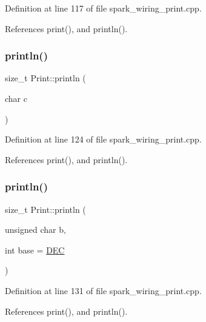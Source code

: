 Definition at line 117 of file spark\+\_\+wiring\+\_\+print.\+cpp.



References print(), and println().

\mbox{\label{class_print_a554896a71162f967b5794401239d7a01}} 
\subsubsection{\texorpdfstring{println()}{println()}\hspace{0.1cm}{\footnotesize\ttfamily [2/21]}}
{\footnotesize\ttfamily size\+\_\+t Print\+::println (\begin{DoxyParamCaption}\item[{char}]{c }\end{DoxyParamCaption})}



Definition at line 124 of file spark\+\_\+wiring\+\_\+print.\+cpp.



References print(), and println().

\mbox{\label{class_print_ac9afe80f50f0118d735295aec7727e50}} 
\subsubsection{\texorpdfstring{println()}{println()}\hspace{0.1cm}{\footnotesize\ttfamily [3/21]}}
{\footnotesize\ttfamily size\+\_\+t Print\+::println (\begin{DoxyParamCaption}\item[{unsigned char}]{b,  }\item[{int}]{base = {\ttfamily \hyperlink{docs_2src_2spark__wiring__print_8h_a26e216c38cffa0a9965fa7933ba558b1}{D\+EC}} }\end{DoxyParamCaption})}



Definition at line 131 of file spark\+\_\+wiring\+\_\+print.\+cpp.



References print(), and println().

\mbox{\label{class_print_a738c88471cfb8eac7c8a804699971413}} 
